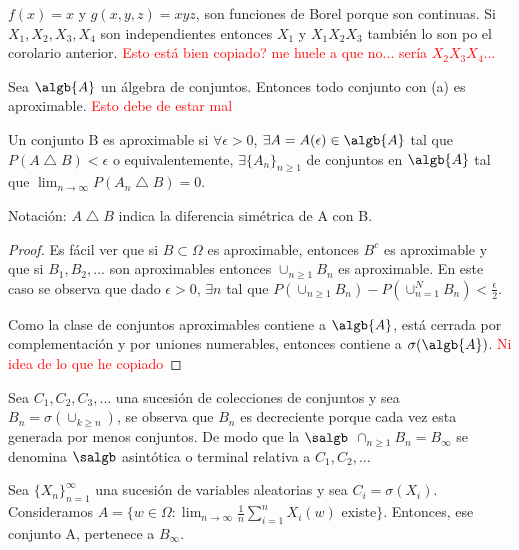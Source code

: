 \documentclass{apuntes}
\begin{document}
\begin{example}
$f(x)=x$ y $g(x,y,z)=xyz$, son funciones de Borel porque son continuas. Si $X_1, X_2, X_3, X_4$ son independientes entonces $X_1$ y $X_1X_2X_3$ también lo son po el corolario anterior. \textcolor{red}{Esto está bien copiado? me huele a que no... sería $X_2X_3X_4$...}
\end{example}

\begin{theorem}
Sea $\algb{A}$ un álgebra de conjuntos. Entonces todo conjunto con (a) es aproximable. \textcolor{red}{Esto debe de estar mal}
\end{theorem}

\begin{defn}
Un conjunto B es aproximable si $\forall \epsilon >0$, $\exists A=A(\epsilon) \in \algb{A}$ tal que $P(A \bigtriangleup B) < \epsilon$ o equivalentemente, $\exists \{A_n\}_{n\geq 1}$ de conjuntos en $\algb{A}$ tal que $\lim_{n \rightarrow \infty}P(A_n \bigtriangleup B)=0$.

Notación: $A \bigtriangleup B$ indica la diferencia simétrica de A con B.
\end{defn}

\begin{proof}
Es fácil ver que si $B \subset \Omega$ es aproximable, entonces $B^c$ es aproximable y que si $B_1,B_2,...$ son aproximables entonces $\cup_{n\geq1} B_n$ es aproximable. En este caso se observa que dado $\epsilon >0$, $\exists n$ tal que $P(\cup_{n\geq1}B_n)-P(\cup_{n=1}^NB_n)<\frac{\epsilon}{2}$.

Como la clase de conjuntos aproximables contiene a $\algb{A}$, está cerrada por complementación y por uniones numerables, entonces contiene a $\sigma(\algb{A})$. \textcolor{red}{Ni idea de lo que he copiado}
\end{proof}

\begin{defn}[[$\sigma$-álgebra asintótica]
Sea $C_1, C_2, C_3,...$ una sucesión de colecciones de conjuntos y sea $B_n=\sigma(\cup_{k\geq n})$, se observa que $B_n$ es decreciente porque cada vez esta generada por menos conjuntos. De modo que la $\salgb$  $\cap_{n\geq 1}B_n=B_{\infty}$ se denomina $\salgb$ asintótica o terminal relativa a $C_1, C_2,...$
\end{defn}

\begin{example}
Sea $\{X_n\}_{n=1}^{\infty}$ una sucesión de variables aleatorias y sea $C_i=\sigma(X_i)$. Consideramos $A= \{w \in \Omega:\lim_{n \rightarrow \infty} \frac{1}{n}\sum_{i=1}^{n} X_i(w)$ existe$\}$. Entonces, ese conjunto A, pertenece a $B_{\infty}$.
\end{example}
\end{document}

